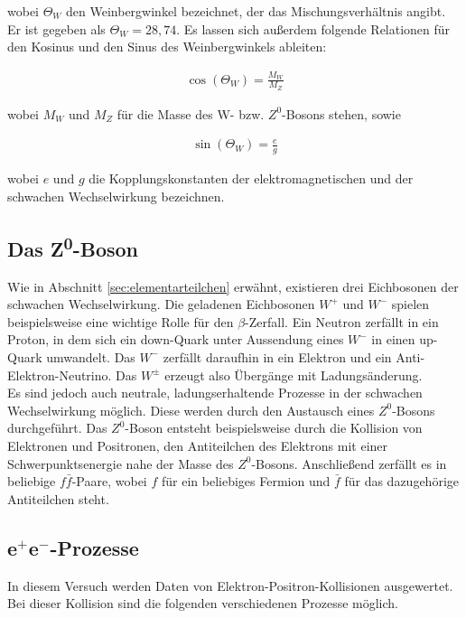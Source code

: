 wobei $\Theta_W$ den Weinbergwinkel bezeichnet, der das Mischungsverhältnis angibt. Er ist gegeben als $\Theta_W = 28,74$. Es lassen sich außerdem folgende Relationen für den Kosinus und den Sinus des Weinbergwinkels ableiten:

\begin{align}
\cos(\Theta_W) = \frac{M_W}{M_Z}
\end{align}

wobei $M_W$ und $M_Z$ für die Masse des W- bzw. $Z^{0}$-Bosons stehen, sowie

\begin{align}
\sin(\Theta_W)=\frac{e}{g}
\end{align}

wobei $e$ und $g$ die Kopplungskonstanten der elektromagnetischen und der schwachen Wechselwirkung bezeichnen.

\subsection{Das Z\textsuperscript0-Boson}

Wie in Abschnitt \ref{sec:elementarteilchen} erwähnt, existieren drei Eichbosonen der schwachen Wechselwirkung. Die geladenen Eichbosonen $W^+$ und $W^-$ spielen beispielsweise eine wichtige Rolle für den $\beta$-Zerfall. Ein Neutron zerfällt in ein Proton, in dem sich ein down-Quark unter Aussendung eines $W^-$ in einen up-Quark umwandelt. Das $W^-$ zerfällt daraufhin in ein Elektron und ein Anti-Elektron-Neutrino. Das $W^\pm$ erzeugt also Übergänge mit Ladungsänderung.\\

Es sind jedoch auch neutrale, ladungserhaltende Prozesse in der schwachen Wechselwirkung möglich. Diese werden durch den Austausch eines $Z^0$-Bosons durchgeführt. Das $Z^0$-Boson entsteht beispielsweise durch die Kollision von Elektronen und Positronen, den Antiteilchen des Elektrons mit einer Schwerpunktsenergie nahe der Masse des $Z^0$-Bosons. Anschließend zerfällt es in beliebige $f\bar{f}$-Paare, wobei $f$ für ein beliebiges Fermion und $\bar{f}$ für das dazugehörige Antiteilchen steht.

\subsection{e$^+$e$^-$-Prozesse}\label{sec:e+e-}

In diesem Versuch werden Daten von Elektron-Positron-Kollisionen ausgewertet. Bei dieser Kollision sind die folgenden verschiedenen Prozesse möglich.
